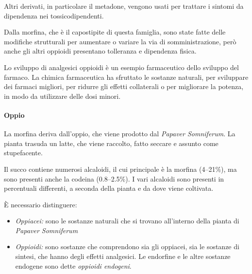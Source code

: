 Altri derivati, in particolare il metadone, vengono usati per trattare i
sintomi da dipendenza nei tossicodipendenti.

Dalla morfina, che è il capostipite di questa famiglia, sono state fatte
delle modifiche strutturali per aumentare o variare la via di
somministrazione, però anche gli altri oppioidi presentano tolleranza e
dipendenza fisica.



Lo sviluppo di analgesici oppioidi è un esempio farmaceutico dello
sviluppo del farmaco. La chimica farmaceutica ha sfruttato le sostanze
naturali, per sviluppare dei farmaci migliori, per ridurre gli effetti
collaterali o per migliorare la potenza, in modo da utilizzare delle
dosi minori.

\paragraph{Oppio}


La morfina deriva dall'oppio, che viene prodotto dal \emph{Papaver
Somniferum}. La pianta trasuda un latte, che viene raccolto, fatto
seccare e assunto come stupefacente.

Il succo contiene numerosi alcaloidi, il cui principale è la morfina
(4--21\%), ma sono presenti anche la codeina (0.8--2.5\%). I vari
alcaloidi
sono presenti in percentuali differenti, a seconda della pianta e da
dove viene coltivata.

È necessario distinguere:

\begin{itemize}
\item
  \emph{Oppiacei:} sono le sostanze naturali che si trovano all'interno
  della pianta di \emph{Papaver Somniferum}
\item
  \emph{Oppioidi:} sono sostanze che comprendono sia gli oppiacei, sia
  le sostanze di sintesi, che hanno degli effetti analgesici. Le
  endorfine e le altre sostanze endogene sono dette \emph{oppioidi
  endogeni}.
\end{itemize}

